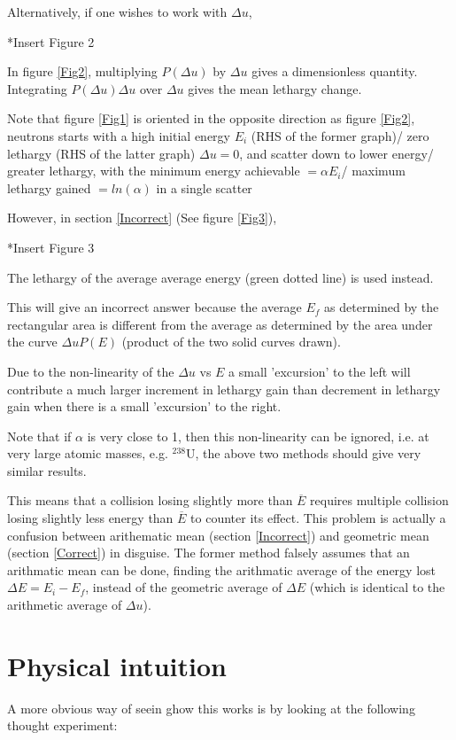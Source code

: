 \documentclass[a4paper, 12pt]{article}
\begin{document}
	
	Alternatively, if one wishes to work with $\Delta u$,
	
	*Insert Figure 2
	
	In figure \ref{Fig2}, multiplying $P(\Delta u)$ by $\Delta u$ gives a dimensionless quantity. \\
	Integrating $P(\Delta u) \Delta u$ over $\Delta u$ gives the mean lethargy change.
	
	Note that figure \ref{Fig1} is oriented in the opposite direction as figure \ref{Fig2}, neutrons starts with a high initial energy $E_i$ (RHS of the former graph)/ zero lethargy (RHS of the latter graph) $\Delta u=0$, and scatter down to lower energy/ greater lethargy, with the minimum energy achievable $= \alpha E_i$/ maximum lethargy gained $= ln(\alpha)$ in a single scatter

	
	However, in section \ref{Incorrect} (See figure \ref{Fig3}),
	
	*Insert Figure 3
	
	The lethargy of the average average energy (green dotted line) is used instead.

	This will give an incorrect answer because the average $E_f$ as determined by the rectangular area is different from the average as determined by the area under the curve $ \Delta u P(E)$ (product of the two solid curves drawn).

	Due to the non-linearity of the $\Delta u$ vs $E$ a small 'excursion' to the left will contribute a much larger increment in lethargy gain than decrement in lethargy gain when there is a small 'excursion' to the right.
	
	Note that if $\alpha$ is very close to 1, then this non-linearity can be ignored, i.e. at very large atomic masses, e.g. ${}^{238}$U, the above two methods should give very similar results.

	This means that a collision losing slightly more than $\overline{E}$ requires multiple collision losing slightly less energy than $\overline{E}$ to counter its effect.
	This problem is actually a confusion between arithematic mean (section \ref{Incorrect}) and geometric mean (section \ref{Correct}) in disguise. The former method falsely assumes that an arithmatic mean can be done, finding the arithmatic average of the energy lost $\Delta E = E_i-E_f$, instead of the geometric average of $\Delta E$ (which is identical to the arithmetic average of $\Delta u$).

\section{Physical intuition}
	A more obvious way of seein ghow this works is by looking at the following thought experiment:
\end{document}

